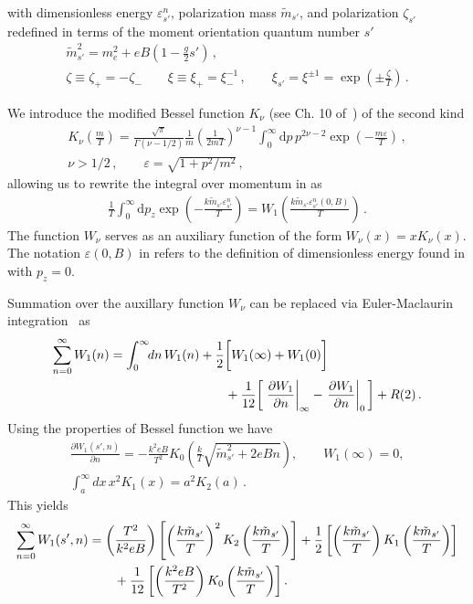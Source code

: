 with dimensionless energy $\varepsilon_{s'}^{n}$, polarization mass $\tilde{m}_{s'}$, and polarization $\zeta_{s'}$ redefined in terms of the moment orientation quantum number $s'$
\begin{gather}
 {\tilde m}_{s'}^{2}=m_{e}^{2}+e{B}\left(1-\frac{g}{2}s'\right)\,,\\
 \zeta\equiv\zeta_{+}=-\zeta_{-}\qquad\xi\equiv\xi_{+}=\xi_{-}^{-1}\,,\qquad\xi_{s'}=\xi^{\pm1}=\exp\left(\pm\frac{\zeta}{T}\right)\,.
\end{gather}

We introduce the modified Bessel function $K_{\nu}$ (see Ch. 10 of~\cite{Letessier:2002ony}) of the second kind
\begin{gather}
\label{besselk}
K_{\nu}\left(\frac{m}{T}\right)=\frac{\sqrt{\pi}}{\Gamma(\nu-1/2)}\frac{1}{m}\left(\frac{1}{2mT}\right)^{\nu-1}
\int_{0}^{\infty}\mathrm{d}p\,p^{2\nu-2}\exp\left({-\frac{m\varepsilon}{T}}\right)\,,\\
\nu>1/2\,,\qquad\varepsilon=\sqrt{1+p^{2}/m^{2}}\,,
\end{gather}
allowing us to rewrite the integral over momentum in  as
\begin{align}
 \label{besselkint}
 \frac{1}{T}\int_{0}^{\infty}\!\!\mathrm{d}p_{z}\exp\!\left(\!{-\frac{k{\tilde m}_{s'}\varepsilon_{s'}^{n}}{T}}\!\right)\!=\!W_{1}\!\!\left(\frac{k{\tilde m}_{s'}\varepsilon_{s'}^{n}(0,{B})}{T}\right)\,.
\end{align}
The function $W_{\nu}$ serves as an auxiliary function of the form $W_{\nu}(x)=xK_{\nu}(x)$. The notation $\varepsilon(0,{B})$ in  refers to the definition of dimensionless energy found in  with $p_{z}=0$.

Summation over the auxillary function $W_{\nu}$ can be replaced via Euler-Maclaurin integration~ as
\begin{align}
\sum^{\infty}_{n=0}W_1(n)=\int^\infty_0\!\!dn\,W_1(n)&+\frac{1}{2}\bigg[W_1(\infty)+W_1(0)\bigg]\notag\\
&\qquad+\frac{1}{12}\bigg[\left.\frac{\partial W_1}{\partial n}\right|_{\infty}-\left.\frac{\partial W_1}{\partial n}\right|_{0}\bigg]+R(2)\,.
\end{align}
Using the properties of Bessel function we have
\begin{align}
\frac{\partial W_1(s',n)}{\partial n}=-\frac{k^2eB}{T^2}K_0\left({\frac{k}{T}\sqrt{\tilde{m}^2_{s'}+2eBn}}\right),\qquad W_1(\infty)=0,\\
\int^\infty_a\!\!dx\,x^2K_1(x)=a^2K_2(a)\,.
\end{align}
This yields
\begin{align}
 \sum^{\infty}_{n=0}W_1(s',n)
 &=\left(\frac{T^2}{k^2eB}\right)\left[\left(\frac{k\tilde{m}_{s'}}{T}\right)^2K_2\left(\frac{k\tilde m_{s'}}{T}\right)\right]+\frac{1}{2}\left[\left(\frac{k\tilde{m}_{s'}}{T}\right)K_1\left(\frac{k\tilde m_{s'}}{T}\right)\right]\notag\\
 &\qquad+\frac{1}{12}\left[\left(\frac{k^2eB}{T^2}\right)K_0\left(\frac{k\tilde m_{s'}}{T}\right)\right].
\end{align}


